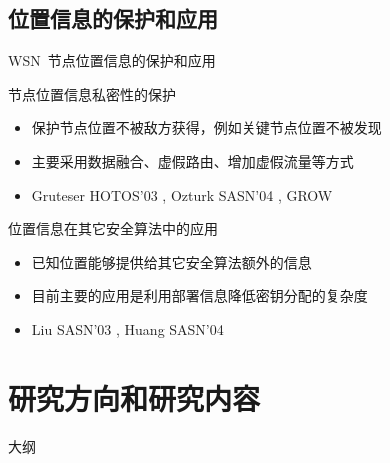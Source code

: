 \documentclass[mathserif,compress,CJKutf8, red]{beamer}
\begin{document}
\begin{CJK*}{UTF8}{song}
\subsection{位置信息的保护和应用}

\begin{frame}{WSN~节点位置信息的保护和应用}

\begin{block}{节点位置信息私密性的保护}
\begin{itemize}
\item 保护节点位置不被敌方获得，例如关键节点位置不被发现
\item 主要采用数据融合、虚假路由、增加虚假流量等方式
\item Gruteser HOTOS'03 \cite{Gruteser2003}, Ozturk SASN'04 \cite{Ozturk2004}, GROW \cite{Xi2006}
\end{itemize}
\end{block}

\bigskip

\begin{block}{位置信息在其它安全算法中的应用}
\begin{itemize}
\item 已知位置能够提供给其它安全算法额外的信息
\item 目前主要的应用是利用部署信息降低密钥分配的复杂度
\item Liu SASN'03 \cite{Liu2003}, Huang SASN'04 \cite{Huang2004}
\end{itemize}
\end{block}
\end{frame}

\section{研究方向和研究内容}

\begin{frame}{大纲}
	\tableofcontents[currentsection]
\end{frame}


\end{CJK*}
\end{document}
